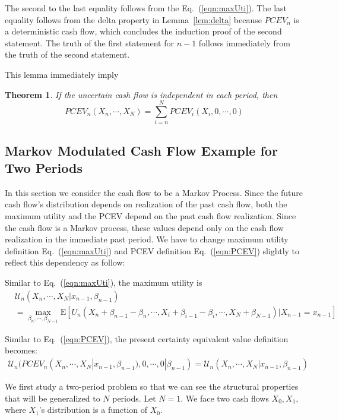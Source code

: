 \documentclass{article}[12pt letter]
\newtheorem{theorem}{Theorem}
\newcommand{\E}{\mathrm{E}}
\begin{document}
The second to the last equality follows from the Eq.~(\ref{eqn:maxUti}).
The last equality follows from the delta property in Lemma~\ref{lem:delta} because $PCEV_n$ is a deterministic cash flow, which concludes the induction proof of the second statement. The truth of the first statement for $n-1$ follows immediately from the truth of the second statement.
\endproof


This lemma immediately imply

\begin{theorem} If the uncertain cash flow is independent in each period, then
\[PCEV_n(X_n, \cdots, X_N)  = \sum_{i=n}^N PCEV_i(X_i,0,\cdots,0)\]
\end{theorem}


\subsection{Markov Modulated Cash Flow Example for Two Periods}

In this section we consider the cash flow to be a Markov Process. Since the future cash flow's distribution depends on realization of the past cash flow, both the maximum utility and the PCEV depend on the past cash flow realization. Since the cash flow is a Markov process, these values depend only on the cash flow realization in the immediate past period. We have to change maximum utility definition Eq.~(\ref{eqn:maxUti}) and PCEV definition Eq.~(\ref{eqn:PCEV}) slightly to reflect this dependency as follow:

Similar to Eq.~(\ref{eqn:maxUti}), the maximum utility is
\begin{align} \label{eqn:maxUtiMK}
    &\mathcal{U}_n(X_n,\cdots, X_{N}|x_{n-1},\beta_{n-1}) \nonumber \\
    & = \max_{\beta_n, \cdots, \beta_{N-1}} \E [U_n(X_n+\beta_{n-1}-\beta_n, \cdots, X_i + \beta_{i-1}-\beta_i, \cdots, X_N + \beta_{N-1})|X_{n-1}=x_{n-1} ]
\end{align}

Similar to Eq.~(\ref{eqn:PCEV}), the present certainty equivalent value definition becomes:
\begin{align} \label{eqn:PCEVMK}
    \mathcal{U}_n(PCEV_n(X_n, \cdots, X_N|x_{n-1},\beta_{n-1}), 0,\cdots,0|\beta_{n-1})=\mathcal{U}_n(X_n,\cdots, X_{N}|x_{n-1},\beta_{n-1})
\end{align}


We first study a two-period problem so that we can see the structural properties that will be generalized to $N$ periods. Let $N=1$. We face two cash flows $X_0, X_1$, where $X_1$'s distribution is a function of $X_0$.
\end{document}
